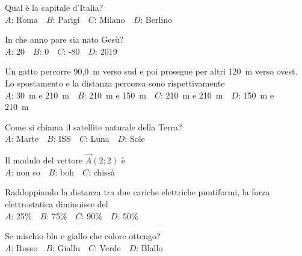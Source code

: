 \mcquestionfooter



\def\mcquestionnumber{5}


\mcquestionheader Qual è la capitale d’Italia?\\
{$A$}: Roma\ \ {$B$}: Parigi\ \ {$C$}: Milano\ \ {$D$}: Berlino\ \ 

\mcquestionfooter



\def\mcquestionnumber{6}


\mcquestionheader In che anno pare sia nato Gesù?\\
{$A$}: 20\ \ {$B$}: 0\ \ {$C$}: -80\ \ {$D$}: 2019\ \ 

\mcquestionfooter



\def\mcquestionnumber{7}


\mcquestionheader Un gatto percorre 90,0~m verso sud e poi prosegue per altri 120~m verso ovest. Lo spostamento e la distanza percorsa sono rispettivamente\\
{$A$}: 30~m e 210~m\ \ {$B$}: 210~m e 150~m\ \ {$C$}: 210~m e 210~m\ \ {$D$}: 150~m e 210~m\ \ 

\mcquestionfooter



\def\mcquestionnumber{8}


\mcquestionheader Come si chiama il satellite naturale della Terra?\\
{$A$}: Marte\ \ {$B$}: ISS\ \ {$C$}: Luna\ \ {$D$}: Sole\ \ 

\mcquestionfooter



\def\mcquestionnumber{9}


\mcquestionheader Il modulo del vettore $\vec{A}(2;2)$ è\\
{$A$}: non so\ \ {$B$}: boh\ \ {$C$}: chissà\ \ 

\mcquestionfooter



\def\mcquestionnumber{10}


\mcquestionheader Raddoppiando la distanza tra due cariche elettriche puntiformi, la forza elettrostatica diminuisce del\\
{$A$}: 25\%\ \ {$B$}: 75\%\ \ {$C$}: 90\%\ \ {$D$}: 50\%\ \ 

\mcquestionfooter



\def\mcquestionnumber{11}


\mcquestionheader Se mischio blu e giallo che colore ottengo?\\
{$A$}: Rosso\ \ {$B$}: Giallu\ \ {$C$}: Verde\ \ {$D$}: Blallo\ \ 

